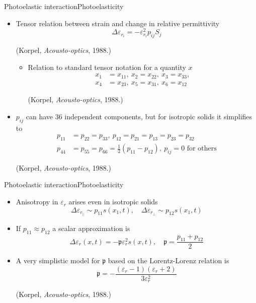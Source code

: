 \documentclass[11pt]{beamer}
\begin{document}
	\begin{frame}{Photoelastic interaction}{Photoelasticity}
		\pause
		\begin{itemize}
			\item Tensor relation between strain and change in relative permittivity
			\begin{equation*}
				\Delta \varepsilon_{r_i} = -\varepsilon_{r_i}^2 p_{ij} S_j
			\end{equation*}
			\parbox{\linewidth}{\tiny (Korpel, \emph{Acousto-optics}, 1988.)}
			\pause
			\begin{itemize}
				\item Relation to standard tensor notation for a quantity $x$
				\begin{align*}
					x_1 &= x_{11},\ x_2 = x_{22},\ x_3 = x_{33}, \\
					x_4 &= x_{23},\ x_5 = x_{31},\ x_6 = x_{12}
				\end{align*}
			\parbox{\linewidth}{\tiny (Korpel, \emph{Acousto-optics}, 1988.)}
			\end{itemize}
			\pause
			\item $p_{ij}$ can have 36 independent components, but for isotropic solids it simplifies to
			\begin{align*}
				p_{11} &= p_{22} = p_{33}, \ p_{12} = p_{21} = p_{13} = p_{23} = p_{32}\\
				p_{44} &= p_{55} = p_{66} = \frac{1}{2} (p_{11} - p_{12}), \ p_{ij} = 0 \text{ for others}
			\end{align*}
			\parbox{\linewidth}{\tiny (Korpel, \emph{Acousto-optics}, 1988.)}
		\end{itemize}
	\end{frame}
	
	\begin{frame}{Photoelastic interaction}{Photoelasticity}
		\begin{itemize}
			\item Anisotropy in $\varepsilon_r$ arises even in isotropic solids
			\begin{equation*}
				\Delta \varepsilon_{r_\parallel} \sim p_{11} s(x_1,t), \quad \Delta \varepsilon_{r_\perp} \sim p_{12} s(x_1,t)
			\end{equation*}
			\pause
			\item If  $p_{11} \approx p_{12}$ a scalar approximation is
			\begin{equation*}
				\Delta \varepsilon_r(x,t) = -\mathfrak{p} \varepsilon_r^2 s(x,t), \quad \mathfrak{p} = \frac{p_{11} + p_{12}}{2}
			\end{equation*}
			\pause
			\item A very simplistic model for $\mathfrak{p}$ based on the Lorentz-Lorenz relation is
			\begin{equation*}
				\mathfrak{p} = -\frac{(\varepsilon_r - 1)(\varepsilon_r + 2)}{3\varepsilon_r^2}
			\end{equation*}
			\parbox{\linewidth}{\tiny (Korpel, \emph{Acousto-optics}, 1988.)}
		\end{itemize}
	\end{frame}
		
\end{document}
